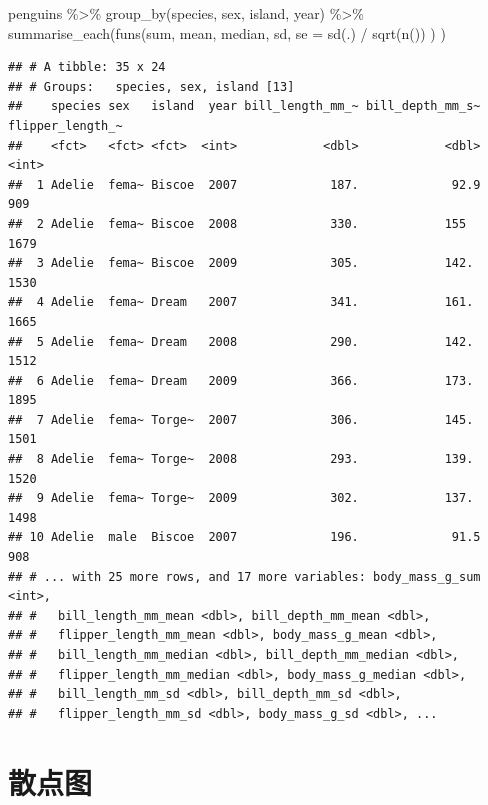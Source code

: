 \documentclass[
]{book}
\newenvironment{Shaded}{\begin{snugshade}}{\end{snugshade}}
\newcommand{\AttributeTok}[1]{\textcolor[rgb]{0.77,0.63,0.00}{#1}}
\newcommand{\FunctionTok}[1]{\textcolor[rgb]{0.00,0.00,0.00}{#1}}
\newcommand{\NormalTok}[1]{#1}
\newcommand{\SpecialCharTok}[1]{\textcolor[rgb]{0.00,0.00,0.00}{#1}}
\begin{document}
\begin{Shaded}
\begin{Highlighting}[]
\NormalTok{penguins }\SpecialCharTok{\%\textgreater{}\%}
  \FunctionTok{group\_by}\NormalTok{(species, sex, island, year) }\SpecialCharTok{\%\textgreater{}\%}
  \FunctionTok{summarise\_each}\NormalTok{(}\FunctionTok{funs}\NormalTok{(sum, }
\NormalTok{                      mean, }
\NormalTok{                      median, }
\NormalTok{                      sd, }
                      \AttributeTok{se =} \FunctionTok{sd}\NormalTok{(.) }\SpecialCharTok{/} \FunctionTok{sqrt}\NormalTok{(}\FunctionTok{n}\NormalTok{())}
\NormalTok{                      )}
\NormalTok{                 )}
\end{Highlighting}
\end{Shaded}

\begin{verbatim}
## # A tibble: 35 x 24
## # Groups:   species, sex, island [13]
##    species sex   island  year bill_length_mm_~ bill_depth_mm_s~ flipper_length_~
##    <fct>   <fct> <fct>  <int>            <dbl>            <dbl>            <int>
##  1 Adelie  fema~ Biscoe  2007             187.             92.9              909
##  2 Adelie  fema~ Biscoe  2008             330.            155               1679
##  3 Adelie  fema~ Biscoe  2009             305.            142.              1530
##  4 Adelie  fema~ Dream   2007             341.            161.              1665
##  5 Adelie  fema~ Dream   2008             290.            142.              1512
##  6 Adelie  fema~ Dream   2009             366.            173.              1895
##  7 Adelie  fema~ Torge~  2007             306.            145.              1501
##  8 Adelie  fema~ Torge~  2008             293.            139.              1520
##  9 Adelie  fema~ Torge~  2009             302.            137.              1498
## 10 Adelie  male  Biscoe  2007             196.             91.5              908
## # ... with 25 more rows, and 17 more variables: body_mass_g_sum <int>,
## #   bill_length_mm_mean <dbl>, bill_depth_mm_mean <dbl>,
## #   flipper_length_mm_mean <dbl>, body_mass_g_mean <dbl>,
## #   bill_length_mm_median <dbl>, bill_depth_mm_median <dbl>,
## #   flipper_length_mm_median <dbl>, body_mass_g_median <dbl>,
## #   bill_length_mm_sd <dbl>, bill_depth_mm_sd <dbl>,
## #   flipper_length_mm_sd <dbl>, body_mass_g_sd <dbl>, ...
\end{verbatim}

\hypertarget{ux6563ux70b9ux56fe-1}{%
\section{散点图}\label{ux6563ux70b9ux56fe-1}}
\end{document}
